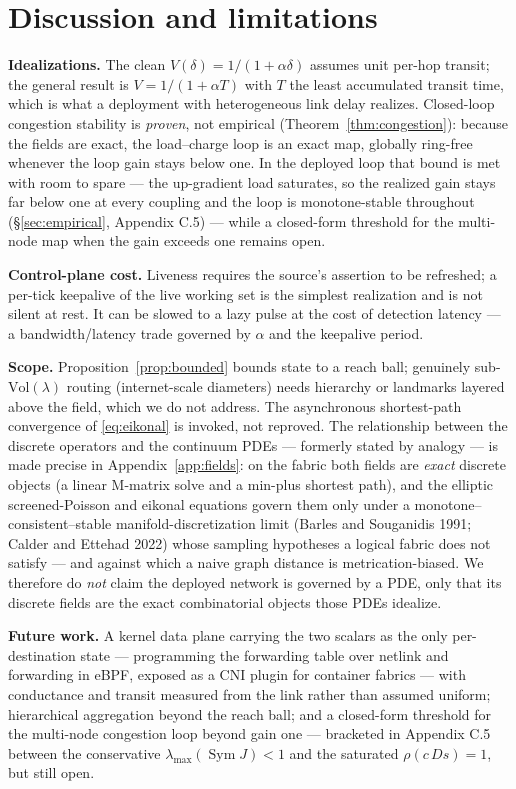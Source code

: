 \documentclass[11pt]{article}
\theoremstyle{plain}
\numberwithin{equation}{section}
\begin{document}
\section{Discussion and limitations}\label{sec:discussion}

\textbf{Idealizations.} The clean $V(\delta)=1/(1+\alpha\delta)$ assumes unit per-hop transit; the general result is $V=1/(1+\alpha T)$ with $T$ the least accumulated transit time, which is what a deployment with heterogeneous link delay realizes. Closed-loop congestion stability is \emph{proven}, not empirical (Theorem~\ref{thm:congestion}): because the fields are exact, the load–charge loop is an exact map, globally ring-free whenever the loop gain stays below one. In the deployed loop that bound is met with room to spare — the up-gradient load saturates, so the realized gain stays far below one at every coupling and the loop is monotone-stable throughout (§\ref{sec:empirical}, Appendix C.5) — while a closed-form threshold for the multi-node map when the gain exceeds one remains open.

\textbf{Control-plane cost.} Liveness requires the source's assertion to be refreshed; a per-tick keepalive of the live working set is the simplest realization and is not silent at rest. It can be slowed to a lazy pulse at the cost of detection latency — a bandwidth/latency trade governed by $\alpha$ and the keepalive period.

\textbf{Scope.} Proposition~\ref{prop:bounded} bounds state to a reach ball; genuinely sub-$\mathrm{Vol}(\lambda)$ routing (internet-scale diameters) needs hierarchy or landmarks layered above the field, which we do not address. The asynchronous shortest-path convergence of \eqref{eq:eikonal} is invoked, not reproved. The relationship between the discrete operators and the continuum PDEs — formerly stated by analogy — is made precise in Appendix~\ref{app:fields}: on the fabric both fields are \emph{exact} discrete objects (a linear M-matrix solve and a min-plus shortest path), and the elliptic screened-Poisson and eikonal equations govern them only under a monotone–consistent–stable manifold-discretization limit (Barles and Souganidis 1991; Calder and Ettehad 2022) whose sampling hypotheses a logical fabric does not satisfy — and against which a naive graph distance is metrication-biased. We therefore do \emph{not} claim the deployed network is governed by a PDE, only that its discrete fields are the exact combinatorial objects those PDEs idealize.

\textbf{Future work.} A kernel data plane carrying the two scalars as the only per-destination state — programming the forwarding table over netlink and forwarding in eBPF, exposed as a CNI plugin for container fabrics — with conductance and transit measured from the link rather than assumed uniform; hierarchical aggregation beyond the reach ball; and a closed-form threshold for the multi-node congestion loop beyond gain one — bracketed in Appendix C.5 between the conservative $\lambda_{\max}(\operatorname{Sym}J)<1$ and the saturated $\rho(c\,Ds)=1$, but still open.
\end{document}
